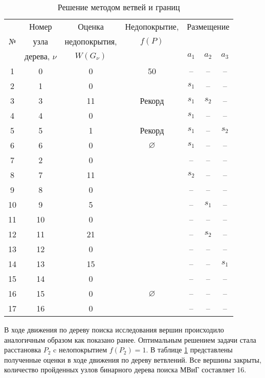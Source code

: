 \begin{longtable}[c]{| c | c | c | c | c  c c|}
  \caption{Решение методом ветвей и границ}\label{part4:branch_and_bound_solution}\\

  \hline
  \multirow{3}{*}{№}& Номер & Оценка & Недопокрытие, &  \multicolumn{3}{c|}{Размещение} \\

  &узла & недопокрытия,& $f(P)$ & &	&	\\ \cline{5-7}
  &дерева, $\nu$ &$W(G_\nu)$& & $a_1$&	$a_2$&	$a_3$\\
  \hline
  1&0 &0&50 & --&	--&	--\\
  2&1 &0& & $s_1$ &	--&	--\\
  3&3 &11& Рекорд & $s_1$ &	$s_2$&	--\\
  4&4 &0&  & $s_1$ &	--&	-- \\
  5&5 &1& Рекорд & $s_1$ &	--&	$s_2$ \\
  6&6 & 0& $\varnothing$& $s_1$ &	--&	-- \\
  7&2 &0& & --&	--&	--\\
  8&7 &11& & $s_2$&	--&	--\\
  9&8 &0& & --&	--&	--\\
  10&9 &5& & --&	$s_1$&	--\\
  11&10 &0& & --&	--&	--\\
  12&11 &21& & --&	$s_2$&	--\\
  13&12 &0& & --&	--&	--\\
  14&13 &15& & --&	--&	$s_1$\\
  15&14 &0& & --&	--&	--\\
  16&15 &0& $\varnothing$& --&	--&	--\\
  17&16 &0& & --&	--&	--\\


  \hline
\end{longtable}

В ходе движения по дереву поиска исследования вершин происходило аналогичным образом как показано ранее. Оптимальным решением задачи стала расстановка $P_2$ c нелопокрытием $f(P_2) = 1$. В таблице \cref{part4:branch_and_bound_solution} представлены полученные оценки в ходе движения по дереву ветвлений.  Все вершины закрыты, количество пройденных узлов бинарного дерева поиска МВиГ составляет 16.

\fixme{================================================================}





